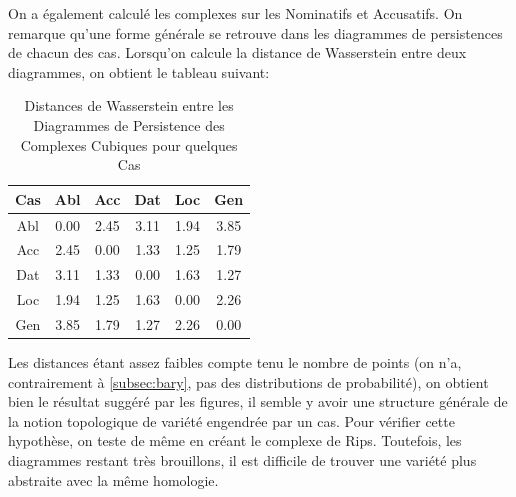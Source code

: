 \documentclass{cours}
\begin{document}
On a également calculé les complexes sur les Nominatifs et Accusatifs. On remarque qu'une forme générale se retrouve dans les diagrammes de persistences de chacun des cas.
Lorsqu'on calcule la distance de Wasserstein entre deux diagrammes, on obtient le tableau suivant:

\begin{table}[H]
\centering
\begin{tabular}{c|ccccc}
	\toprule
	Cas & Abl & Acc & Dat & Loc & Gen\\
	\midrule
	Abl & 0.00 & 2.45 & 3.11 & 1.94 & 3.85\\
	Acc & 2.45 & 0.00 & 1.33 & 1.25 & 1.79\\
	Dat & 3.11 & 1.33 & 0.00 & 1.63 & 1.27\\
	Loc & 1.94 & 1.25 & 1.63 & 0.00 & 2.26\\
	Gen & 3.85 & 1.79 & 1.27 & 2.26 & 0.00\\
	\bottomrule
\end{tabular}
\caption{Distances de Wasserstein entre les Diagrammes de Persistence des Complexes Cubiques pour quelques Cas}
\end{table}

Les distances étant assez faibles compte tenu le nombre de points (on n'a, contrairement à \ref{subsec:bary}, pas des distributions de probabilité), on obtient bien le résultat suggéré par les figures, il semble y avoir une structure générale de la notion topologique de variété engendrée par un cas.
Pour vérifier cette hypothèse, on teste de même en créant le complexe de Rips.
Toutefois, les diagrammes restant très brouillons, il est difficile de trouver une variété plus abstraite avec la même homologie.
\end{document}
